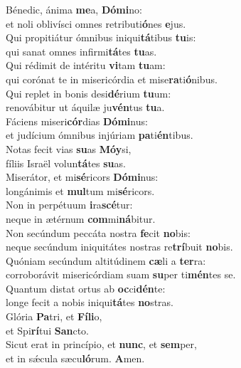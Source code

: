 \evenverse Bénedic, ánima \textbf{me}a, \textbf{Dó}\textbf{mi}no:~\*\\
\evenverse et noli oblivísci omnes retributi\textbf{ó}nes \textbf{e}jus.\\
\oddverse Qui propitiátur ómnibus iniqui\textbf{tá}tibus \textbf{tu}is:~\*\\
\oddverse qui sanat omnes infirmi\textbf{tá}tes \textbf{tu}as.\\
\evenverse Qui rédimit de intéritu \textbf{vi}tam \textbf{tu}am:~\*\\
\evenverse qui corónat te in misericórdia et mise\textbf{ra}ti\textbf{ó}nibus.\\
\oddverse Qui replet in bonis desi\textbf{dé}rium \textbf{tu}um:~\*\\
\oddverse renovábitur ut áquilæ ju\textbf{vén}tus \textbf{tu}a.\\
\evenverse Fáciens miseri\textbf{cór}dias \textbf{Dó}\textbf{mi}nus:~\*\\
\evenverse et judícium ómnibus injúriam \textbf{pa}ti\textbf{én}tibus.\\
\oddverse Notas fecit vias \textbf{su}as \textbf{Mó}\textbf{y}si,~\*\\
\oddverse fíliis Israël volun\textbf{tá}tes \textbf{su}as.\\
\evenverse Miserátor, et mi\textbf{sé}ricors \textbf{Dó}\textbf{mi}nus:~\*\\
\evenverse longánimis et \textbf{mul}tum mi\textbf{sé}ricors.\\
\oddverse Non in perpétuum \textbf{i}ra\textbf{scé}tur:~\*\\
\oddverse neque in ætérnum \textbf{com}mi\textbf{ná}bitur.\\
\evenverse Non secúndum peccáta nostra \textbf{fe}cit \textbf{no}bis:~\*\\
\evenverse neque secúndum iniquitátes nostras re\textbf{trí}buit \textbf{no}bis.\\
\oddverse Quóniam secúndum altitúdinem \textbf{cæ}li a \textbf{ter}ra:~\*\\
\oddverse corroborávit misericórdiam suam \textbf{su}per ti\textbf{mén}tes se.\\
\evenverse Quantum distat ortus ab \textbf{oc}ci\textbf{dén}te:~\*\\
\evenverse longe fecit a nobis iniqui\textbf{tá}tes \textbf{no}stras.\\
\oddverse Glória \textbf{Pa}tri, et \textbf{Fí}\textbf{li}o,~\*\\
\oddverse et Spi\textbf{rí}tui \textbf{San}cto.\\
\evenverse Sicut erat in princípio, et \textbf{nunc}, et \textbf{sem}per,~\*\\
\evenverse et in sǽcula sæcu\textbf{ló}rum. \textbf{A}men.\\

